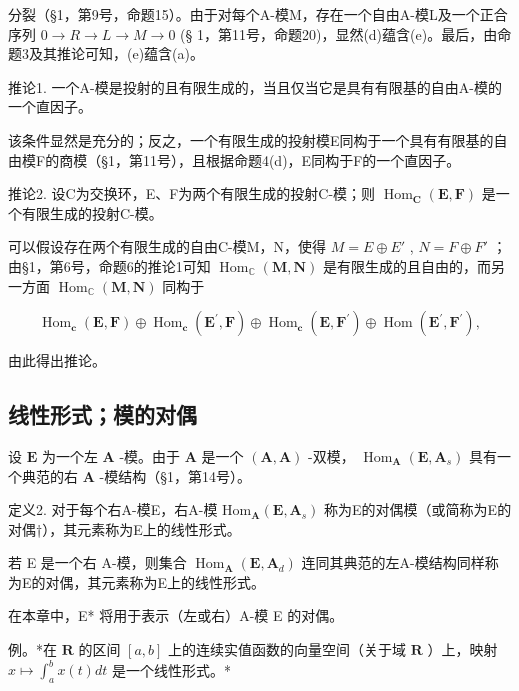 分裂（§1，第9号，命题15）。由于对每个A-模M，存在一个自由A-模L及一个正合序列 \(0 \to R \to L \to M \to 0\) (§ 1，第11号，命题20)，显然(d)蕴含(e)。最后，由命题3及其推论可知，(e)蕴含(a)。

推论1. 一个A-模是投射的且有限生成的，当且仅当它是具有有限基的自由A-模的一个直因子。

该条件显然是充分的；反之，一个有限生成的投射模E同构于一个具有有限基的自由模F的商模（§1，第11号），且根据命题4(d)，E同构于F的一个直因子。

推论2. 设C为交换环，E、F为两个有限生成的投射C-模；则 \(\operatorname{Hom}_{\mathbf{C}}(\mathbf{E}, \mathbf{F})\) 是一个有限生成的投射C-模。

可以假设存在两个有限生成的自由C-模M，N，使得 \(M = E \oplus E'\) , \(N = F \oplus F'\) ；由§1，第6号，命题6的推论1可知 \(\operatorname{Hom}_{\mathbb{C}}(\mathbf{M}, \mathbf{N})\) 是有限生成的且自由的，而另一方面 \(\operatorname{Hom}_{\mathbb{C}}(\mathbf{M}, \mathbf{N})\) 同构于

\[
\operatorname{Hom} _ {\mathbf {c}} (\mathbf {E}, \mathbf {F}) \oplus \operatorname{Hom} _ {\mathbf {c}} (\mathbf {E} ^ {\prime}, \mathbf {F}) \oplus \operatorname{Hom} _ {\mathbf {c}} (\mathbf {E}, \mathbf {F} ^ {\prime}) \oplus \operatorname{Hom} (\mathbf {E} ^ {\prime}, \mathbf {F} ^ {\prime}),
\]

由此得出推论。

\subsection{线性形式；模的对偶}

设 \(\mathbf{E}\) 为一个左 \(\mathbf{A}\) -模。由于 \(\mathbf{A}\) 是一个 \((\mathbf{A}, \mathbf{A})\) -双模， \(\operatorname{Hom}_{\mathbf{A}}(\mathbf{E}, \mathbf{A}_s)\) 具有一个典范的右 \(\mathbf{A}\) -模结构（§1，第14号）。

定义2. 对于每个右A-模E，右A-模 \(\mathrm{Hom}_{\mathbf{A}}(\mathbf{E},\mathbf{A}_{s})\) 称为E的对偶模（或简称为E的对偶†），其元素称为E上的线性形式。

若 E 是一个右 A-模，则集合 \(\operatorname{Hom}_{\mathbf{A}}(\mathbf{E}, \mathbf{A}_{d})\) 连同其典范的左A-模结构同样称为E的对偶，其元素称为E上的线性形式。

在本章中，E* 将用于表示（左或右）A-模 E 的对偶。

例。*在 \(\mathbf{R}\) 的区间 \([a, b]\) 上的连续实值函数的向量空间（关于域 \(\mathbf{R}\) ）上，映射 \(x \mapsto \int_{a}^{b} x(t) dt\) 是一个线性形式。*

